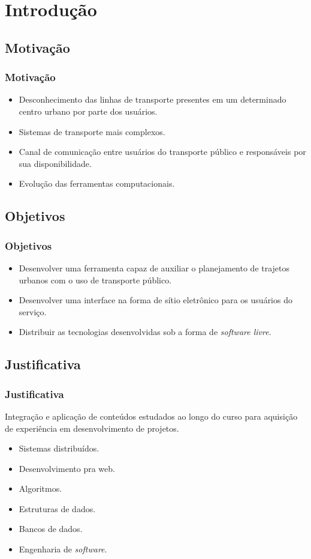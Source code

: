 \section{Introdução}
\subsection{Motivação}

\frame
{
\frametitle{Motivação}
\begin{itemize}
\item Desconhecimento das linhas de transporte presentes em um determinado centro urbano por parte dos usuários.
\item Sistemas de transporte mais complexos.
\item Canal de comunicação entre usuários do transporte público e responsáveis por sua disponibilidade.
\item Evolução das ferramentas computacionais.
\end{itemize}
}

\subsection{Objetivos}
\frame
{
\frametitle{Objetivos}
	
\begin{itemize}
\item Desenvolver uma ferramenta capaz de auxiliar o planejamento de trajetos urbanos com o uso de transporte público.
\item Desenvolver uma interface na forma de sítio eletrônico para os usuários do serviço.
\item Distribuir as tecnologias desenvolvidas sob a forma de \emph{software livre}.
\end{itemize}
}

\subsection{Justificativa}
\frame
{
\frametitle{Justificativa}
Integração e aplicação de conteúdos estudados ao longo do curso para aquisição de experiência em desenvolvimento de projetos.
\begin{itemize}
	\item Sistemas distribuídos.
	\item Desenvolvimento pra web.
	\item Algoritmos.
	\item Estruturas de dados.
	\item Bancos de dados.
	\item Engenharia de \emph{software}.
\end{itemize}



}
